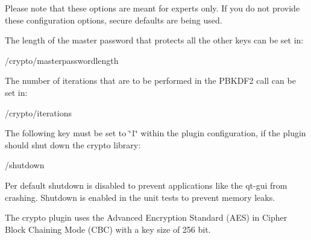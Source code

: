 Please note that these options are meant for experts only. If you do not provide these configuration options, secure defaults are being used.

The length of the master password that protects all the other keys can be set in\+:


\begin{DoxyCode}
/crypto/masterpasswordlength
\end{DoxyCode}


The number of iterations that are to be performed in the P\+B\+K\+D\+F2 call can be set in\+:


\begin{DoxyCode}
/crypto/iterations
\end{DoxyCode}


The following key must be set to {\ttfamily \char`\"{}1\char`\"{}} within the plugin configuration, if the plugin should shut down the crypto library\+:


\begin{DoxyCode}
/shutdown
\end{DoxyCode}


Per default shutdown is disabled to prevent applications like the qt-\/gui from crashing. Shutdown is enabled in the unit tests to prevent memory leaks.

The crypto plugin uses the Advanced Encryption Standard (A\+ES) in Cipher Block Chaining Mode (C\+BC) with a key size of 256 bit. 